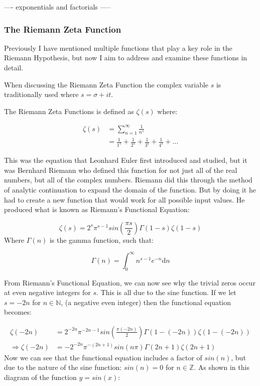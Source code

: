 \documentclass{article}
\begin{document}
---- exponentials and factorials -----

\subsubsection{The Riemann Zeta Function}

Previously I have mentioned multiple functions that play a key role in the Riemann Hypothesis, but now I aim to address and examine these functions in detail.

When discussing the Riemann Zeta Function the complex variable $s$ is traditionally used where $s =\sigma  + it$.

The Riemann Zeta Functions is defined as $\zeta(s)$ where:

\begin{align*}
    \zeta(s) &= \sum_{n=1}^{\infty} \frac{1}{n^s}\\
    &= \frac{1}{1^s} + \frac{1}{2^s} + \frac{1}{3^s} + \frac{1}{4^s} + \dots
\end{align*}

This was the equation that Leonhard Euler first introduced and studied, but it was Bernhard Riemann who defined this function for not just all of the real numbers, but all of the complex numbers. Riemann did this through the method of analytic continuation to expand the domain of the function. But by doing it he had to create a new function that would work for all possible input values. He produced what is known as Riemann's Functional Equation:

$$\zeta(s) = 2^s\pi^{s-1}sin\left(\frac{\pi s}{2}\right)\Gamma(1-s)\zeta(1-s) $$
Where $\Gamma(n)$ is the gamma function, such that:

$$\Gamma(n) = \int_{0}^{\infty}n^{s-1}e^{-n} \mathrm{d}n$$

From Riemann's Functional Equation, we can now see why the trivial zeros occur at even negative integers for $s$. This is all due to the sine function. If we let $s = -2n$ for $n \in \mathbb{N}$, (a negative even integer) then the functional equation becomes:

\begin{align*}
    \zeta(-2n) &= 2^{-2n}\pi^{-2n-1}sin\left(\frac{\pi(-2n)}{2}\right)\Gamma(1-(-2n))\zeta(1-(-2n))\\
    \Rightarrow \zeta(-2n) &= -2^{-2n}\pi^{-(2n+1)}sin(n \pi)\Gamma(2n+1)\zeta(2n+1)
\end{align*}
Now we can see that the functional equation includes a factor of $sin(n)$, but due to the nature of the sine function: $sin(n) = 0$ for $n \in  \mathbb{Z}$.  As shown in this diagram of the function $y = sin(x)$:
\end{document}
